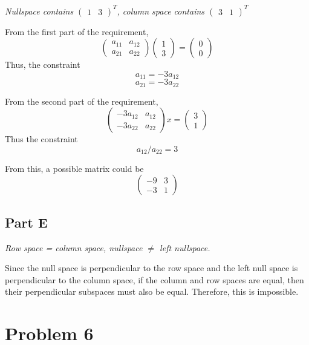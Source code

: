 \documentclass{article}
\begin{document}
\textit{Nullspace contains $\begin{pmatrix} 1 & 3 \end{pmatrix}^T$, column space
contains $\begin{pmatrix} 3 & 1 \end{pmatrix}^T$}

\bigbreak

From the first part of the requirement,
$$ \begin{pmatrix}
    a_{11} & a_{12} \\
    a_{21} & a_{22}
\end{pmatrix} \begin{pmatrix}
    1 \\
    3
\end{pmatrix} = \begin{pmatrix}
    0 \\
    0
\end{pmatrix} $$
Thus, the constraint
$$ a_{11} = -3 a_{12} $$
$$ a_{21} = -3 a_{22} $$

From the second part of the requirement,
$$ \begin{pmatrix}
    -3 a_{12} & a_{12} \\
    -3 a_{22} & a_{22}
\end{pmatrix} x = \begin{pmatrix}
    3 \\
    1
\end{pmatrix} $$
Thus the constraint
$$ a_{12} / a_{22} = 3 $$

From this, a possible matrix could be
$$ \begin{pmatrix}
    -9 & 3 \\
    -3 & 1
\end{pmatrix} $$

\subsection*{Part E}

\textit{Row space = column space, nullspace $\neq$ left nullspace.}

\bigbreak

Since the null space is perpendicular to the row space and the left null
space is perpendicular to the column space, if the column and row spaces are
equal, then their perpendicular subspaces must also be equal. Therefore, this
is impossible.

\section*{Problem 6}
\end{document}
